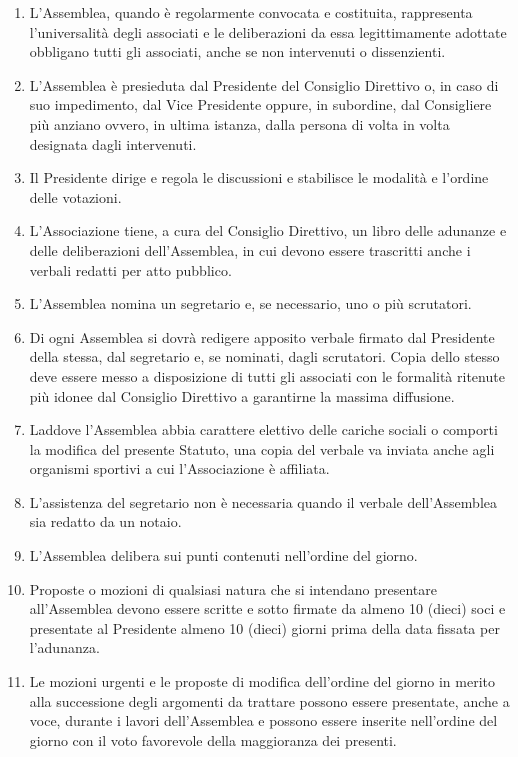 \documentclass{djtsdoc}
\begin{document}
\begin{enumerate}
		\item L'Assemblea, quando è regolarmente convocata e costituita, rappresenta l'universalità degli associati e le deliberazioni da essa legittimamente adottate obbligano tutti gli associati, anche se non intervenuti o dissenzienti.
		\item L'Assemblea è presieduta dal Presidente del Consiglio Direttivo o, in caso di suo impedimento, dal Vice Presidente oppure, in subordine, dal Consigliere più anziano ovvero, in ultima istanza, dalla persona di volta in volta designata dagli intervenuti.
		\item Il Presidente dirige e regola le discussioni e stabilisce le modalità e l'ordine delle votazioni.
		\item L'Associazione tiene, a cura del Consiglio Direttivo, un libro delle adunanze e delle deliberazioni dell'Assemblea, in cui devono essere trascritti anche i verbali redatti per atto pubblico.
		\item L'Assemblea nomina un segretario e, se necessario, uno o più scrutatori.
		\item Di ogni Assemblea si dovrà redigere apposito verbale firmato dal Presidente della stessa, dal segretario e, se nominati, dagli scrutatori. Copia dello stesso deve essere messo a disposizione di tutti gli associati con le formalità ritenute più idonee dal Consiglio Direttivo a garantirne la massima diffusione.
		\item Laddove l'Assemblea abbia carattere elettivo delle cariche sociali o comporti la modifica del presente Statuto, una copia del verbale va inviata anche agli organismi sportivi a cui l'Associazione è affiliata.
		\item L'assistenza del segretario non è necessaria quando il verbale dell'Assemblea sia redatto da un notaio.
		\item L'Assemblea delibera sui punti contenuti nell'ordine del giorno.
		\item Proposte o mozioni di qualsiasi natura che si intendano presentare all'Assemblea devono essere scritte e sotto firmate da almeno 10 (dieci) soci e presentate al Presidente almeno 10 (dieci) giorni prima della data fissata per l'adunanza.
		\item Le mozioni urgenti e le proposte di modifica dell'ordine del giorno in merito alla successione degli argomenti da trattare possono essere presentate, anche a voce, durante i lavori dell'Assemblea e possono essere inserite nell'ordine del giorno con il voto favorevole della maggioranza dei presenti.
	\end{enumerate}
	
\end{document}
